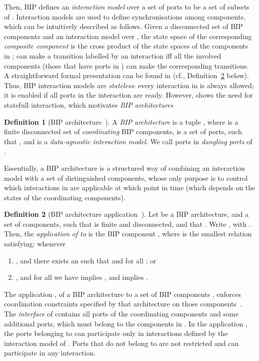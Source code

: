\documentclass[submission,copyright,creativecommons,hidelinks]{eptcs}
\theoremstyle{plain} \newtheorem{theorem}{Theorem}
\theoremstyle{definition}
\newtheorem{definition}{Definition}
\theoremstyle{remark}
\newcommand{\defn}[1]{Definition~\ref{defn:#1}}
\begin{document}
Then, BIP defines an \emph{interaction model} over a set of ports  to be a set of subsets of . 
Interaction models are used to define synchronisations among
components, which can be intuitively described as follows.  Given a
disconnected set of BIP components  and an interaction
model  over , the state space of the
corresponding {\em composite component}  is the
cross product of the state spaces of the components in ;
 can make a transition labelled by an interaction
 iff all the involved components (those that have ports
in ) can make the corresponding transitions.  A straightforward
formal presentation can be found in \cite{BliSif07-acp-emsoft} (cf., \defn{archapp} below).
Thus, BIP interaction models are \emph{stateless}: every interaction in  is always allowed; it is enabled if all ports in the interaction are ready.
However, \cite{ABBJS14} shows the need for statefull interaction, which motivates {\em BIP architectures}

\begin{definition}[BIP architecture~\cite{ABBJS14}]
\label{defn:archi}
A {\em BIP architecture} is a tuple , where  is a finite disconnected set of {\em coordinating} BIP components,  is a set of ports, such that , and  is a {\em data-agnostic interaction model}. We call ports in  {\em dangling ports} of .
\end{definition}

Essentially, a BIP architecture is a structured way of combining an interaction model  with a set of distinguished components, whose only purpose is to control which interactions in  are applicable at which point in time (which depends on the states of the coordinating components).

\begin{definition}[BIP architecture application~\cite{ABBJS14}]
   \label{defn:archapp}
   Let  be a BIP architecture, and  a set of components, such that  is finite and disconnected, and that . Write , with . Then, the {\em application  of  to } is the BIP component , where  is the smallest relation satisfying:  whenever
\begin{enumerate}
	\item , and there exists an  such that  and  for all ; or
	\item , and for all  we have  implies , and  implies .
\end{enumerate}
\end{definition}

The application , of a BIP architecture  to a set of BIP components , enforces coordination constraints specified by that architecture on those components~\cite{ABBJS14}.
The \emph{interface}  of 
contains all ports  of the coordinating components  and some
additional ports, which must belong to the components in .  In
the application , the ports belonging to  can
participate only in interactions defined by the interaction model
 of . 
Ports that do not belong to  are not restricted and can participate in any interaction.  
\end{document}
